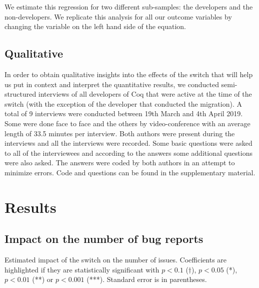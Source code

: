 \documentclass[conference]{IEEEtran}
\begin{document}
We estimate this regression for two different sub-samples: the developers and the non-developers. We replicate this analysis for all our outcome variables by changing the variable on the left hand side of the equation. 

\subsection{Qualitative}

In order to obtain qualitative insights into the effects of the switch that will help us put in context and interpret the quantitative results, we conducted semi-structured interviews of all developers of Coq that were active at the time of the switch (with the exception of the developer that conducted the migration). A total of 9 interviews were conducted between 19th March and 4th April 2019. Some were done face to face and the others by video-conference with an average length of 33.5 minutes per interview. Both authors were present during the interviews and all the interviews were recorded. Some basic questions were asked to all of the interviewees and according to the answers some additional questions were also asked. The answers were coded by both authors in an attempt to minimize errors. Code and questions can be found in the supplementary material. 

\section{Results}
\label{results}
\subsection{Impact on the number of bug reports}

\begin{table}
\centering
\caption{Estimated impact of the switch on the number of issues. Coefficients are highlighted if they are statistically significant with $p<0.1$ ($\dagger$), $p<0.05$ (*), $p<0.01$ (**) or $p<0.001$ (***). Standard error is in parentheses.}
\label{tab:bug_nb}

\end{table}
\end{document}

